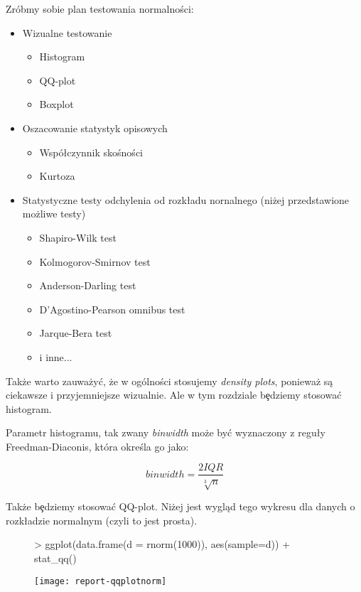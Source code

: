 \documentclass{article}
\begin{document}
\noindent
\quad Zróbmy sobie plan testowania normalności:

\begin{itemize}
  \item Wizualne testowanie
  \begin{itemize}
    \item Histogram
    \item QQ-plot
    \item Boxplot
  \end{itemize}
  \item Oszacowanie statystyk opisowych
  \begin{itemize}
    \item Wspó\l czynnik skośności
    \item Kurtoza
  \end{itemize}
  \item Statystyczne testy odchylenia od rozk\l adu nornalnego (niżej przedstawione możliwe testy)
  \begin {itemize}
    \item Shapiro-Wilk test
    \item Kolmogorov-Smirnov test
    \item Anderson-Darling test
    \item D'Agostino-Pearson omnibus test
    \item Jarque-Bera test
    \item i inne...
  \end{itemize}
\end{itemize}

\noindent
\quad Także warto zauważy\'c, że w ogólności stosujemy \textit{density plots}, ponieważ są ciekawsze i przyjemniejsze wizualnie. Ale w tym rozdziale b\c edziemy stosowa\'c histogram.

\noindent
\quad Parametr histogramu, tak zwany \textit{binwidth} może by\'c wyznaczony z regu\l y Freedman-Diaconis, która określa go jako:

\[ binwidth = \frac{2IQR}{\sqrt[3]{n}}\]

\noindent
\quad Także b\c edziemy stosowa\'c QQ-plot. Niżej jest wygląd tego wykresu dla danych o rozk\l adzie normalnym (czyli to jest prosta).

\begin{figure}[h!]
\centering
\begin{Schunk}
\begin{Sinput}
> ggplot(data.frame(d = rnorm(1000)), aes(sample=d)) + stat_qq()
\end{Sinput}
\end{Schunk}
\texttt{[image: report-qqplotnorm]}
\end{figure}
\end{document}
